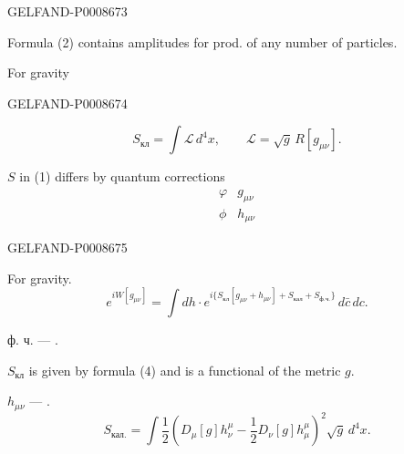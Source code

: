 \begin{GelfandAdjacentEvidence}{GELFAND-P000867}{3}


Formula (2) contains amplitudes for prod. of any number of particles.

For gravity

\end{GelfandAdjacentEvidence}
\begin{GelfandAdjacentEvidence}{GELFAND-P000867}{4}

\begin{equation*}
S_{\text{кл}}=\int\mathcal{L}\,d^4x,\qquad
\mathcal{L}=\sqrt{g}\,R[g_{\mu\nu}]. \tag{4}
\end{equation*}

$S$ in (1) differs by quantum corrections
\begin{equation*}
\begin{array}{cc}
\varphi&g_{\mu\nu}\\
\phi&h_{\mu\nu}
\end{array} \tag{5}
\end{equation*}
\end{GelfandAdjacentEvidence}
\begin{GelfandAdjacentEvidence}{GELFAND-P000867}{5}

For gravity.
\begin{equation*}
e^{iW[g_{\mu\nu}]}=\int dh\cdot
 e^{i\{S_{\text{кл}}[g_{\mu\nu}+h_{\mu\nu}]+S_{\text{кал}}+S_{\text{ф.ч.}}\}}\,
 d\bar c\,dc. \tag{6}
\end{equation*}

ф. ч. --- .

$S_{\text{кл}}$ is given by formula (4) and is a functional of the metric $g$.

$h_{\mu\nu}$ --- .
\begin{equation*}
S_{\text{кал.}}=\int\frac12
\left(D_\mu[g]h^{\mu}_{\nu}-\frac12 D_\nu[g]h_{\mu}^{\mu}\right)^2
\sqrt{g}\,d^4x. \tag{7}
\end{equation*}
\end{GelfandAdjacentEvidence}
